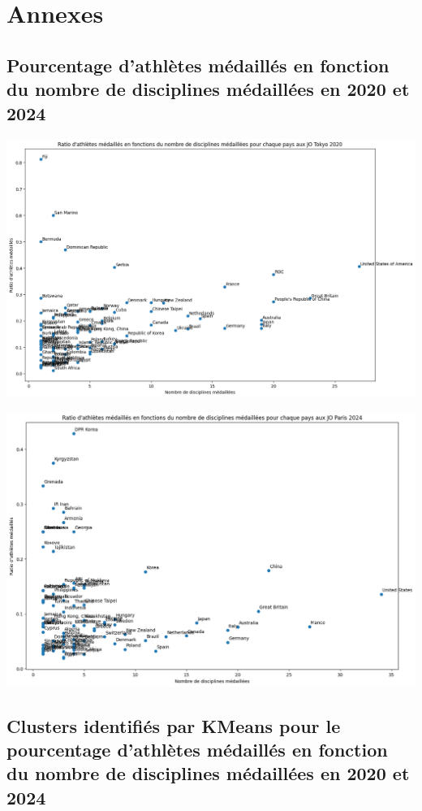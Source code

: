 \documentclass{article}
\begin{document}
\clearpage
\section*{Annexes}
\renewcommand{\thesubsection}{\Alph{subsection}}

\subsection{Pourcentage d’athlètes médaillés en fonction du nombre de disciplines médaillées en 2020 et 2024}
\label{annexe_athletes_disciplines}

\includegraphics[width=\linewidth]{assets/athletes_disciplines_2020}

\hfill

\includegraphics[width=\linewidth]{assets/athletes_disciplines_2024.png}

\clearpage
\subsection{Clusters identifiés par KMeans pour le pourcentage d'athlètes médaillés en fonction du nombre de disciplines médaillées en 2020 et 2024}
\label{annexe_athletes_disciplines_clusters}
\end{document}

